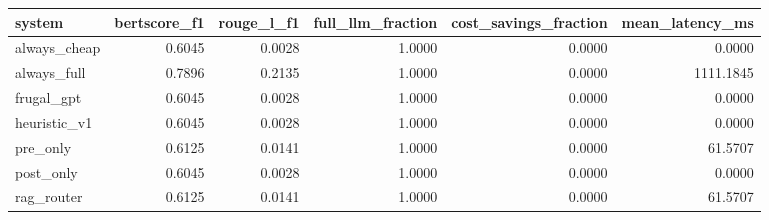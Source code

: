 \begin{tabular}{lrrrrr}
\toprule
system & bertscore_f1 & rouge_l_f1 & full_llm_fraction & cost_savings_fraction & mean_latency_ms \\
\midrule
always_cheap & 0.6045 & 0.0028 & 1.0000 & 0.0000 & 0.0000 \\
always_full & 0.7896 & 0.2135 & 1.0000 & 0.0000 & 1111.1845 \\
frugal_gpt & 0.6045 & 0.0028 & 1.0000 & 0.0000 & 0.0000 \\
heuristic_v1 & 0.6045 & 0.0028 & 1.0000 & 0.0000 & 0.0000 \\
pre_only & 0.6125 & 0.0141 & 1.0000 & 0.0000 & 61.5707 \\
post_only & 0.6045 & 0.0028 & 1.0000 & 0.0000 & 0.0000 \\
rag_router & 0.6125 & 0.0141 & 1.0000 & 0.0000 & 61.5707 \\
\bottomrule
\end{tabular}
